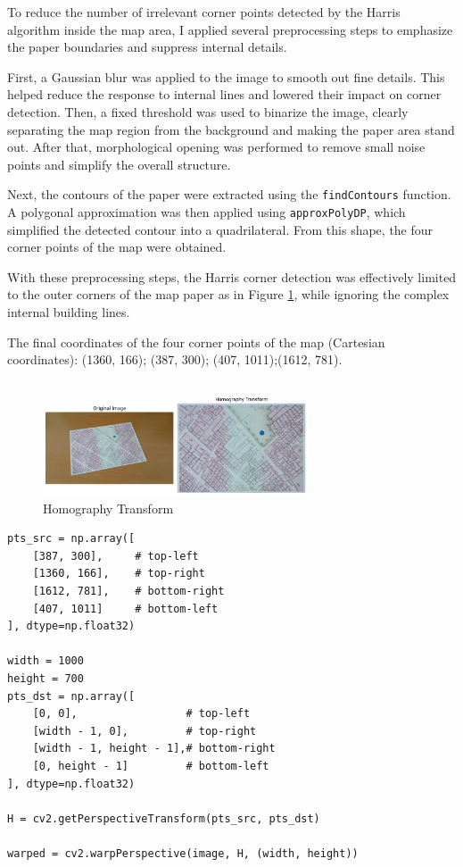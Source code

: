 \documentclass[12pt]{article}
\begin{document}
To reduce the number of irrelevant corner points detected by the Harris algorithm inside the map area, I applied several preprocessing steps to emphasize the paper boundaries and suppress internal details.

First, a Gaussian blur was applied to the image to smooth out fine details. This helped reduce the response to internal lines and lowered their impact on corner detection. Then, a fixed threshold was used to binarize the image, clearly separating the map region from the background and making the paper area stand out. After that, morphological opening was performed to remove small noise points and simplify the overall structure.

Next, the contours of the paper were extracted using the \texttt{findContours} function. A polygonal approximation was then applied using \texttt{approxPolyDP}, which simplified the detected contour into a quadrilateral. From this shape, the four corner points of the map were obtained.

With these preprocessing steps, the Harris corner detection was effectively limited to the outer corners of the map paper as in Figure \ref{2.1}, while ignoring the complex internal building lines.

The final coordinates of the four corner points of the map (Cartesian coordinates): (1360, 166); (387, 300); (407, 1011);(1612, 781).

\subsection{}
\begin{figure}[ht]
    \centering
    \includegraphics[width=0.7\textwidth]{pics/a7-2.2.png}
    \caption{Homography Transform}
    \label{2.1}
\end{figure}

\begin{lstlisting}
pts_src = np.array([
    [387, 300],     # top-left
    [1360, 166],    # top-right
    [1612, 781],    # bottom-right
    [407, 1011]     # bottom-left
], dtype=np.float32)

width = 1000
height = 700
pts_dst = np.array([
    [0, 0],                 # top-left
    [width - 1, 0],         # top-right
    [width - 1, height - 1],# bottom-right
    [0, height - 1]         # bottom-left
], dtype=np.float32)

H = cv2.getPerspectiveTransform(pts_src, pts_dst)

warped = cv2.warpPerspective(image, H, (width, height))
\end{lstlisting}
\end{document}
